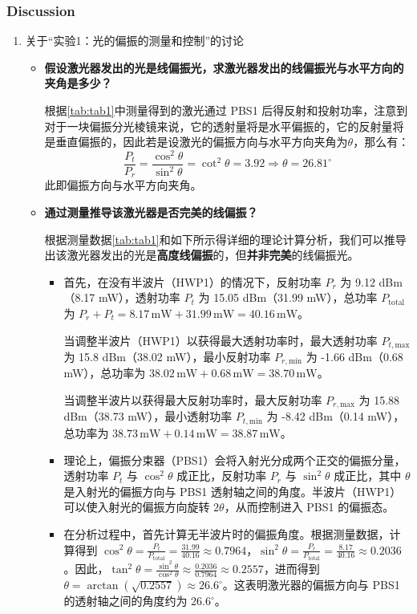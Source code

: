 \subsubsection{Discussion}
\begin{enumerate}
	\item 关于“实验1：光的偏振的测量和控制”的讨论
	\begin{itemize}
		\item \textbf{假设激光器发出的光是线偏振光，求激光器发出的线偏振光与水平方向的夹角是多少？}
		
		根据\cref{tab:tab1}中测量得到的激光通过 PBS1 后得反射和投射功率，注意到对于一块偏振分光棱镜来说，它的透射量将是水平偏振的，它的反射量将是垂直偏振的，因此若是设激光的偏振方向与水平方向夹角为$\theta$，那么有：
		$$
		\frac{P_t}{P_r} = \frac{\cos^2\theta}{\sin^2\theta} = \cot^2\theta = 3.92 \Rightarrow \theta = 26.81^{\circ}
		$$
		此即偏振方向与水平方向夹角。
		
		\item \textbf{通过测量推导该激光器是否完美的线偏振？}
		
		根据测量数据\cref{tab:tab1}和如下所示得详细的理论计算分析，我们可以推导出该激光器发出的光是\textbf{高度线偏振}的，但\textbf{并非完美}的线偏振光。
		\begin{itemize}
			\item 首先，在没有半波片（HWP1）的情况下，反射功率 \(P_r\) 为 9.12 dBm（8.17 mW），透射功率 \(P_t\) 为 15.05 dBm（31.99 mW），总功率 \(P_{\text{total}}\) 为 \(P_r + P_t = 8.17\,\text{mW} + 31.99\,\text{mW} = 40.16\,\text{mW}\)。
			
			当调整半波片（HWP1）以获得最大透射功率时，最大透射功率 \(P_{t,\text{max}}\) 为 15.8 dBm（38.02 mW），最小反射功率 \(P_{r,\text{min}}\) 为 -1.66 dBm（0.68 mW），总功率为 \(38.02\,\text{mW} + 0.68\,\text{mW} = 38.70\,\text{mW}\)。
			
			当调整半波片以获得最大反射功率时，最大反射功率 \(P_{r,\text{max}}\) 为 15.88 dBm（38.73 mW），最小透射功率 \(P_{t,\text{min}}\) 为 -8.42 dBm（0.14 mW），总功率为 \(38.73\,\text{mW} + 0.14\,\text{mW} = 38.87\,\text{mW}\)。
			
			\item 理论上，偏振分束器（PBS1）会将入射光分成两个正交的偏振分量，透射功率 \(P_t\) 与 \(\cos^2\theta\) 成正比，反射功率 \(P_r\) 与 \(\sin^2\theta\) 成正比，其中 \(\theta\) 是入射光的偏振方向与 PBS1 透射轴之间的角度。半波片（HWP1）可以使入射光的偏振方向旋转 \(2\theta\)，从而控制进入 PBS1 的偏振态。
			
			\item 在分析过程中，首先计算无半波片时的偏振角度。根据测量数据，计算得到 \(\cos^2\theta = \frac{P_t}{P_{\text{total}}} = \frac{31.99}{40.16} \approx 0.7964\)，\(\sin^2\theta = \frac{P_r}{P_{\text{total}}} = \frac{8.17}{40.16} \approx 0.2036\)。因此，\(\tan^2\theta = \frac{\sin^2\theta}{\cos^2\theta} \approx \frac{0.2036}{0.7964} \approx 0.2557\)，进而得到 \(\theta = \arctan(\sqrt{0.2557}) \approx 26.6^\circ\)。这表明激光器的偏振方向与 PBS1 的透射轴之间的角度约为 \(26.6^\circ\)。
			

\end{itemize}
\end{itemize}
\end{enumerate}

